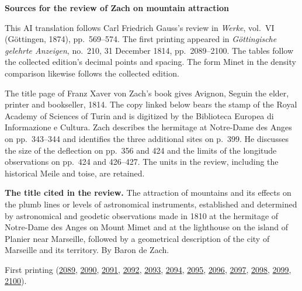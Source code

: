 \clearpage\thispagestyle{empty}
\begin{center}\Large\bfseries Sources for the review of Zach on mountain attraction\end{center}

This AI translation follows Carl Friedrich Gauss’s review in \emph{Werke}, vol.~VI (Göttingen, 1874), pp.~569--574. The first printing appeared in \emph{Göttingische gelehrte Anzeigen}, no.~210, 31 December 1814, pp.~2089--2100. The tables follow the collected edition’s decimal points and spacing. The form Minet in the density comparison likewise follows the collected edition.

The title page of Franz Xaver von Zach’s book gives Avignon, Seguin the elder, printer and bookseller, 1814. The copy linked below bears the stamp of the Royal Academy of Sciences of Turin and is digitized by the Biblioteca Europea di Informazione e Cultura. Zach describes the hermitage at Notre-Dame des Anges on pp.~343--344 and identifies the three additional sites on p.~399. He discusses the size of the deflection on pp.~356 and 424 and the limits of the longitude observations on pp.~424 and 426--427. The units in the review, including the historical Meile and toise, are retained.

\noindent\textbf{The title cited in the review.} The attraction of mountains and its effects on the plumb lines or levels of astronomical instruments, established and determined by astronomical and geodetic observations made in 1810 at the hermitage of Notre-Dame des Anges on Mount Mimet and at the lighthouse on the island of Planier near Marseille, followed by a geometrical description of the city of Marseille and its territory. By Baron de Zach.

First printing (\href{https://images.p.sub.uni-goettingen.de/iiif/image/gdz:PPN319721507_1814:00002099/full/1650,/0/default.jpg}{2089}, \href{https://images.p.sub.uni-goettingen.de/iiif/image/gdz:PPN319721507_1814:00002100/full/1650,/0/default.jpg}{2090}, \href{https://images.p.sub.uni-goettingen.de/iiif/image/gdz:PPN319721507_1814:00002101/full/1650,/0/default.jpg}{2091}, \href{https://images.p.sub.uni-goettingen.de/iiif/image/gdz:PPN319721507_1814:00002102/full/1650,/0/default.jpg}{2092}, \href{https://images.p.sub.uni-goettingen.de/iiif/image/gdz:PPN319721507_1814:00002103/full/1650,/0/default.jpg}{2093}, \href{https://images.p.sub.uni-goettingen.de/iiif/image/gdz:PPN319721507_1814:00002104/full/1650,/0/default.jpg}{2094}, \href{https://images.p.sub.uni-goettingen.de/iiif/image/gdz:PPN319721507_1814:00002105/full/1650,/0/default.jpg}{2095}, \href{https://images.p.sub.uni-goettingen.de/iiif/image/gdz:PPN319721507_1814:00002106/full/1650,/0/default.jpg}{2096}, \href{https://images.p.sub.uni-goettingen.de/iiif/image/gdz:PPN319721507_1814:00002107/full/1650,/0/default.jpg}{2097}, \href{https://images.p.sub.uni-goettingen.de/iiif/image/gdz:PPN319721507_1814:00002108/full/1650,/0/default.jpg}{2098}, \href{https://images.p.sub.uni-goettingen.de/iiif/image/gdz:PPN319721507_1814:00002109/full/1650,/0/default.jpg}{2099}, \href{https://images.p.sub.uni-goettingen.de/iiif/image/gdz:PPN319721507_1814:00002110/full/1650,/0/default.jpg}{2100}).

